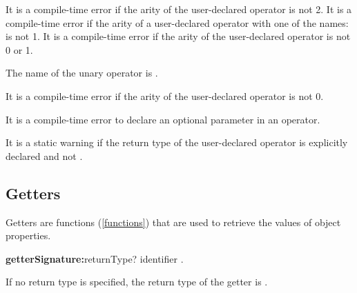 \documentclass{article}
\begin{document}
\LMHash{}
It is a compile-time error if the arity of the user-declared operator \code{[]=} is not 2.
It is a compile-time error if the arity of a user-declared operator with one of the names: \code{<, >, <=, >=, ==, -, +, \~{}/, /, *, \%, $|$, \^{}, \&, $<<$, $>>$, $>>>$, []} is not 1.
It is a compile-time error if the arity of the user-declared operator \code{-} is not 0 or 1.


\LMHash{}
The name of the unary operator \code{-} is .


\LMHash{}
It is a compile-time error if the arity of the user-declared operator \code{\~{}} is not 0.

\LMHash{}
It is a compile-time error to declare an optional parameter in an operator.

\LMHash{}
It is a static warning if the return type of the user-declared operator \code{[]=} is explicitly declared and not \VOID{}.




\subsection{Getters}

\LMHash{}
Getters are functions (\ref{functions}) that are used to retrieve the values of object properties.

\begin{grammar}
{\bf getterSignature:}returnType? \GET{} identifier
  .
\end{grammar}

\LMHash{}
If no return type is specified, the return type of the getter is \DYNAMIC{}.
\end{document}
